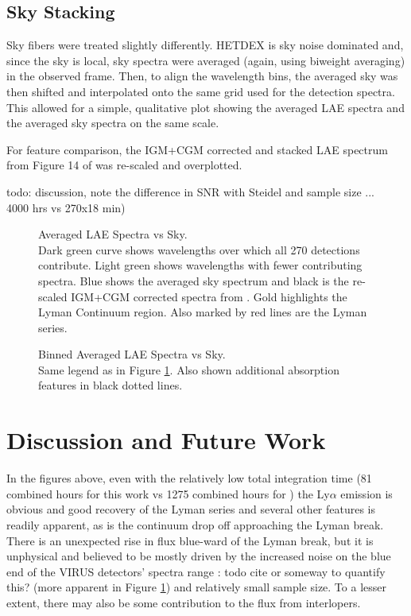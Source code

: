 \documentclass{aastex62}
\begin{document}
\subsection{Sky Stacking}

Sky fibers were treated slightly differently. HETDEX is sky noise dominated and, since the sky is local, sky spectra were averaged (again, using biweight averaging) in the observed frame. Then, to align the wavelength bins, the averaged sky was then shifted and interpolated onto the same grid used for the detection spectra. This allowed for a simple, qualitative plot showing the averaged LAE spectra and the averaged sky spectra on the same scale.

For feature comparison, the IGM+CGM corrected and stacked LAE spectrum from Figure 14 of \cite{Steidel} was re-scaled and overplotted.  

{ \color{red} todo: discussion, note the difference in SNR with Steidel and sample size ... ~ 4000 hrs vs 270x18 min)}


\begin{figure}[H]
\caption{Averaged LAE Spectra vs Sky. \label{fig:biweight_unbinned}\\
Dark green curve shows wavelengths over which all 270 detections contribute. Light green shows wavelengths with fewer contributing spectra. Blue shows the averaged sky spectrum and black is the re-scaled IGM+CGM corrected spectra from \cite{Steidel}. Gold highlights the Lyman Continuum region. Also marked by red lines are the Lyman series.}
\end{figure}

\begin{figure}[H]
\caption{Binned Averaged LAE Spectra vs Sky.\label{fig:biweight_binned} \\
Same legend as in Figure \ref{fig:biweight_unbinned}. Also shown additional absorption features in black dotted lines.}
\end{figure}





\section{Discussion and Future Work} \label{sec:discussion}

In the figures above, even with the relatively low total integration time (81 combined hours for this work vs 1275 combined hours for \cite{Steidel}) the Ly$\alpha$ emission is obvious and good recovery of the Lyman series and several other features is readily apparent, as is the continuum drop off approaching the Lyman break. There is an unexpected rise in flux blue-ward of the Lyman break, but it is unphysical and believed to be mostly driven by the increased noise on the blue end of the VIRUS detectors' spectra range {\color{red}: todo cite or someway to quantify this?} (more apparent in Figure \ref{fig:biweight_unbinned}) and relatively small sample size. To a lesser extent, there may also be some contribution to the flux from interlopers.\\
\end{document}
